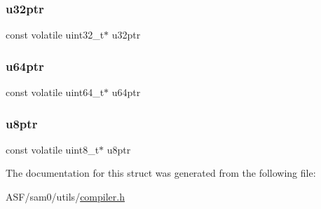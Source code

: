 \subsubsection{\texorpdfstring{u32ptr}{u32ptr}}
{\footnotesize\ttfamily const volatile uint32\+\_\+t$\ast$ u32ptr}

\mbox{\label{struct_struct_c_v_ptr_a24a2bedaf12d427819c62babba34e2ef}} 
\subsubsection{\texorpdfstring{u64ptr}{u64ptr}}
{\footnotesize\ttfamily const volatile uint64\+\_\+t$\ast$ u64ptr}

\mbox{\label{struct_struct_c_v_ptr_ae6228fb5d646745079910ea045f314e3}} 
\subsubsection{\texorpdfstring{u8ptr}{u8ptr}}
{\footnotesize\ttfamily const volatile uint8\+\_\+t$\ast$ u8ptr}



The documentation for this struct was generated from the following file\+:\begin{DoxyCompactItemize}
\item 
A\+S\+F/sam0/utils/\mbox{\hyperlink{compiler_8h}{compiler.\+h}}\end{DoxyCompactItemize}
